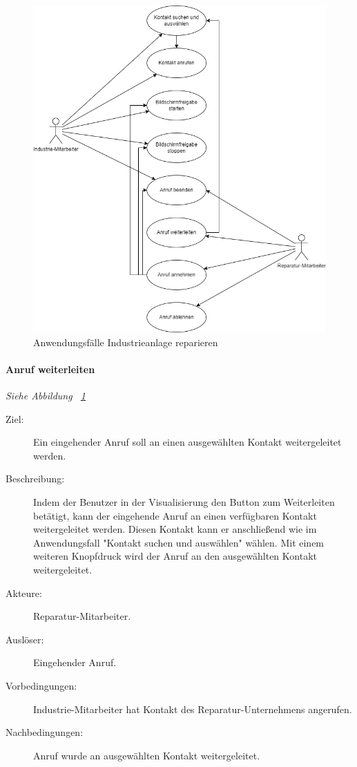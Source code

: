 \begin{figure}[ht!]
    \centering
    \includegraphics[width=\paperwidth-2in]{../assets/img/UML-Anwendungsfalldiagramme-Industrieanlage reparieren.drawio}
    \caption{Anwendungsfälle Industrieanlage reparieren}
    \label{fig:industrieanlage-reparieren}
\end{figure}

\paragraph{\large{Anruf weiterleiten}}
\textit{Siehe Abbildung ~\ref{fig:industrieanlage-reparieren}}
    \begin{description}
        \item[Ziel:] Ein eingehender Anruf soll an einen ausgewählten Kontakt weitergeleitet werden.
        \item[Beschreibung:] Indem der Benutzer in der Visualisierung den Button zum Weiterleiten betätigt, kann der eingehende Anruf an einen verfügbaren Kontakt weitergeleitet werden.
            Diesen Kontakt kann er anschließend wie im Anwendungsfall "Kontakt suchen und auswählen" wählen.
            Mit einem weiteren Knopfdruck wird der Anruf an den ausgewählten Kontakt weitergeleitet.
        \item[Akteure:] Reparatur-Mitarbeiter.
        \item[Auslöser:] Eingehender Anruf.
        \item[Vorbedingungen:] Industrie-Mitarbeiter hat Kontakt des Reparatur-Unternehmens angerufen.
        \item[Nachbedingungen:] Anruf wurde an ausgewählten Kontakt weitergeleitet.
    \end{description}

